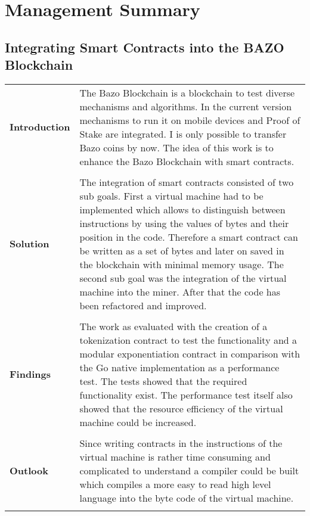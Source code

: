 \chapter*{Management Summary}
\thispagestyle{main} %

\section*{Integrating Smart Contracts into the BAZO Blockchain}

\begin{tabular}[t]{ p{3cm} p{12.5cm}}
\textbf{Introduction} & 
The Bazo Blockchain is a blockchain to test diverse mechanisms and algorithms. In the current version mechanisms to run it on mobile devices and Proof of Stake are integrated. I is only possible to transfer Bazo coins by now. The idea of this work is to enhance the Bazo Blockchain with smart contracts. \\ \\

\raggedright
\textbf{Solution} & 
The integration of smart contracts consisted of two sub goals. First a virtual machine had to be implemented which allows to distinguish between instructions by using the values of bytes and their position in the code. Therefore a smart contract can be written as a set of bytes and later on saved in the blockchain with minimal memory usage. The second sub goal was the integration of the virtual machine into the miner. After that the code has been refactored and improved. \\ \\

\raggedright
\textbf{Findings} & 
The work as evaluated with the creation of a tokenization contract to test the functionality and a modular exponentiation contract in comparison with the Go native implementation as a performance test. The tests showed that the required functionality exist. The performance test itself also showed that the resource efficiency of the virtual machine could be increased. \\ \\

\textbf{Outlook} &
Since writing contracts in the instructions of the virtual machine is rather time consuming and complicated to understand a compiler could be built which compiles a more easy to read high level language into the byte code of the virtual machine.
\\ \\
\end{tabular}
